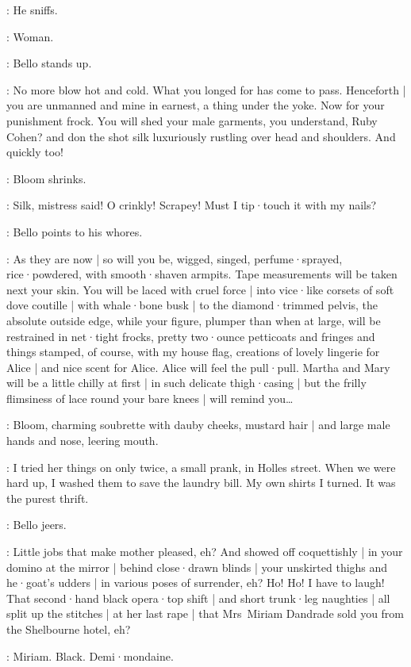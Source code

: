 :
He sniffs.

\Bloom:
Woman.

:
Bello stands up.

\Bello:
No more blow hot and cold.
What you longed for has come to pass.
Henceforth |
you are unmanned and mine in earnest,
a thing under the yoke.
Now for your punishment frock.
You will shed your male garments,
you understand,
Ruby Cohen?
and don the shot silk luxuriously rustling over head and shoulders.
And quickly too!

:
Bloom shrinks.

\Bloom:
Silk,
mistress said!
O crinkly!
Scrapey!
Must I tip·touch it with my nails?

:
Bello points to his whores.

\Bello:
As they are now |
so will you be,
wigged,
singed,
perfume·sprayed,
rice·powdered,
with smooth·shaven armpits.
Tape measurements will be taken next your skin.
You will be laced with cruel force |
into vice·like corsets of soft dove coutille |
with whale·bone busk |
to the diamond·trimmed pelvis,
the absolute outside edge,
while your figure,
plumper than when at large,
will be restrained in net·tight frocks,
pretty two·ounce petticoats and fringes and things stamped,
of course,
with my house flag,
%
creations of lovely lingerie for Alice |
and nice scent for Alice.
Alice will feel the pull·pull.
Martha and Mary will be a little chilly at first |
in such delicate thigh·casing |
but the frilly flimsiness of lace round your bare knees |
will remind you…

:
Bloom,
charming soubrette with dauby cheeks,
mustard hair |
and large male hands and nose,
leering mouth.

\Bloom:
I tried her things on only twice,
a small prank,
in Holles street.
When we were hard up,
I washed them to save the laundry bill.
My own shirts I turned.
It was the purest thrift.

:
Bello jeers.

\Bello:
Little jobs that make mother pleased,
eh?
%
And showed off coquettishly |
in your domino at the mirror |
behind close·drawn blinds |
your unskirted thighs and he·goat's udders |
in various poses of surrender,
eh?
Ho! Ho!
I have to laugh!
That second·hand black opera·top shift |
and short trunk·leg naughties |
all split up the stitches |
at her last rape |
that Mrs~Miriam Dandrade sold you from the Shelbourne hotel,
eh?

\Bloom:
Miriam.
Black.
Demi·mondaine.

